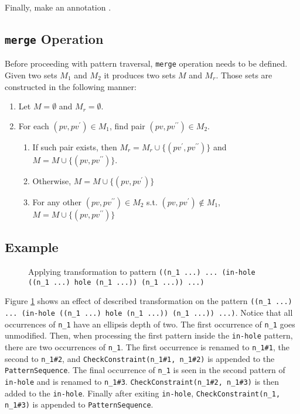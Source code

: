 Finally, make an annotation .

\subsection{\texttt{merge} Operation}
Before proceeding with pattern traversal, \texttt{merge} operation needs to be defined. Given two sets $M_1$ and $M_2$ it produces two sets $M$ and $M_r$. Those sets are constructed in the following manner:

\begin{enumerate}
\item Let $M=\emptyset$ and $M_r=\emptyset$.
\item For each $(pv, pv^{\prime}) \in M_1$, find pair $(pv, pv^{\prime\prime}) \in M_2$.
\begin{enumerate}
\item If such pair exists, then $M_r=M_r \cup \{(pv^{\prime},  pv^{\prime\prime})\}$ and $M=M \cup \{(pv,  pv^{\prime\prime})\}$.
\item Otherwise, $M=M \cup \{(pv,  pv^{\prime})\}$
\item For any other $(pv, pv^{\prime\prime}) \in M_2$ s.t.  $(pv, pv^{\prime}) \notin M_1$, $M=M \cup \{(pv,  pv^{\prime\prime})\}$
\end{enumerate}
\end{enumerate}

\subsection{Example}

\begin{figure}[ht]
	\centering
\caption{Applying transformation to pattern \texttt{((n\_1 ...) ... (in-hole ((n\_1 ...) hole (n\_1 ...)) (n\_1 ...)) ...)}}
\label{transformation-pattern-constraintcheck}
\end{figure}

Figure \ref{transformation-pattern-constraintcheck} shows an effect of described transformation on the pattern \texttt{((n\_1 ...) ... (in-hole ((n\_1 ...) hole (n\_1 ...)) (n\_1 ...)) ...)}. Notice that all occurrences of \texttt{n\_1} have an ellipsis depth of two. The first occurrence of \texttt{n\_1} goes unmodified. Then, when processing the first pattern inside the \texttt{in-hole} pattern, there are two occurrences of \texttt{n\_1}. The first occurrence is renamed to \texttt{n\_1\#1}, the second to \texttt{n\_1\#2}, and \texttt{CheckConstraint(n\_1\#1, n\_1\#2)} is appended to the \texttt{PatternSequence}. The final occurrence of \texttt{n\_1} is seen in the second pattern of \texttt{in-hole} and is renamed to \texttt{n\_1\#3}. \texttt{CheckConstraint(n\_1\#2, n\_1\#3)} is then added to the \texttt{in-hole}. Finally after exiting \texttt{in-hole}, \texttt{CheckConstraint(n\_1, n\_1\#3)} is appended to \texttt{PatternSequence}.
